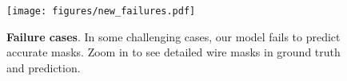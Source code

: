 \begin{figure}[h!]
    \setlength{\abovecaptionskip}{1mm}
    \centering
    \texttt{[image: figures/new\_failures.pdf]}
    \caption{\textbf{Failure cases}. In some challenging cases, our model fails to predict accurate masks. Zoom in to see detailed wire masks in ground truth and prediction.}
    \label{fig:new_failures}
    \vspace{-10mm}
\end{figure}